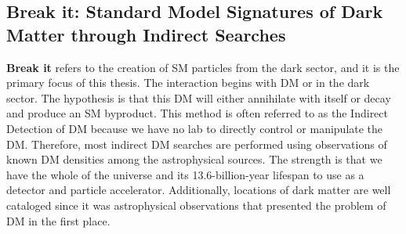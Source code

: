 \begin{figure}[h]
\end{figure}

\subsection{Break it: Standard Model Signatures of Dark Matter through Indirect Searches\label{sec:break_it}}

\textbf{Break it} refers to the creation of SM particles from the dark sector, and it is the primary focus of this thesis.
The interaction begins with DM or in the dark sector.
The hypothesis is that this DM will either annihilate with itself or decay and produce an SM byproduct.
This method is often referred to as the Indirect Detection of DM because we have no lab to directly control or manipulate the DM.
Therefore, most indirect DM searches are performed using observations of known DM densities among the astrophysical sources.
The strength is that we have the whole of the universe and its 13.6-billion-year lifespan to use as a detector and particle accelerator.
Additionally, locations of dark matter are well cataloged since it was astrophysical observations that presented the problem of DM in the first place.

